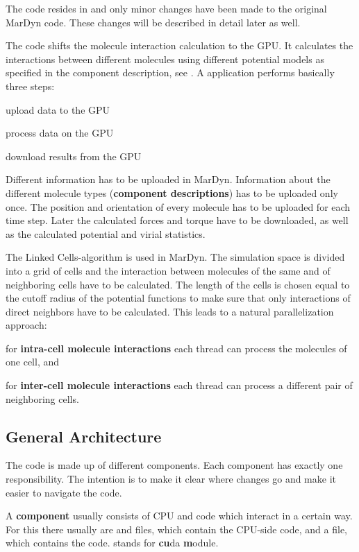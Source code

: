 The code resides in  and only minor changes have been made to the original MarDyn code. These changes will be described in detail later as well.

The \cuda{} code shifts the molecule interaction calculation to the GPU. It calculates the interactions between different molecules using different potential models as specified in the component description, see \cite{buchholz10framework}.
A \cuda{} application performs basically three steps:
\begin{compactenum}
\item upload data to the GPU
\item process data on the GPU
\item download results from the GPU
\end{compactenum} 
Different information has to be uploaded in MarDyn. Information about the different molecule types (\textbf{component descriptions}) has to be uploaded only once. The position and orientation of every molecule has to be uploaded for each time step. 
Later the calculated forces and torque have to be downloaded, as well as the calculated potential and virial statistics.

The Linked Cells-algorithm is used in MarDyn. The simulation space is divided into a grid of cells and the interaction between molecules of the same and of neighboring cells have to be calculated. The length of the cells is chosen equal to the cutoff radius of the potential functions to make sure that only interactions of direct neighbors have to be calculated.
This leads to a natural parallelization approach:
\begin{compactitem}
\item for \textbf{intra-cell molecule interactions} each thread can process the molecules of one cell, and
\item for \textbf{inter-cell molecule interactions} each thread can process a different pair of neighboring cells.
\end{compactitem}

\subsection{General Architecture}
The \cuda{} code is made up of different components. Each component has exactly one responsibility.
The intention is to make it clear where changes go and make it easier to navigate the code.

A \textbf{component} usually consists of CPU and \cuda{} code which interact in a certain way. For this there usually are  and  files, which contain the CPU-side code, and a  file, which contains the \cuda{} code.  stands for \textbf{cu}da \textbf{m}odule.

